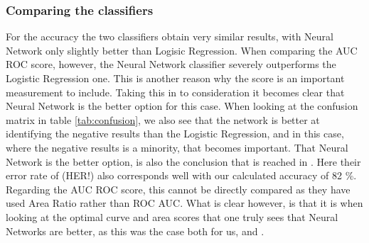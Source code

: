 \subsubsection{Comparing the classifiers}
For the accuracy the two classifiers obtain very similar results, with Neural Network only slightly better than Logisic Regression. When comparing the AUC ROC score, however, the Neural Network classifier severely outperforms the Logistic Regression one. This is another reason why the score is an important measurement to include. Taking this in to consideration it becomes clear that Neural Network is the better option for this case. When looking at the confusion matrix in table \ref{tab:confusion}, we also see that the network is better at identifying the negative results than the Logistic Regression, and in this case, where the negative results is a minority, that becomes important. That Neural Network is the better option, is also the conclusion that is reached in \cite{yeh2009UCI}. Here their error rate of (HER!) also corresponds well with our calculated accuracy of 82 \%. Regarding the AUC ROC score, this cannot be directly compared as they have used Area Ratio rather than ROC AUC. What is clear however, is that it is when looking at the optimal curve and area scores that one truly sees that Neural Networks are better, as this was the case both for us, and \cite{yeh2009UCI}.
